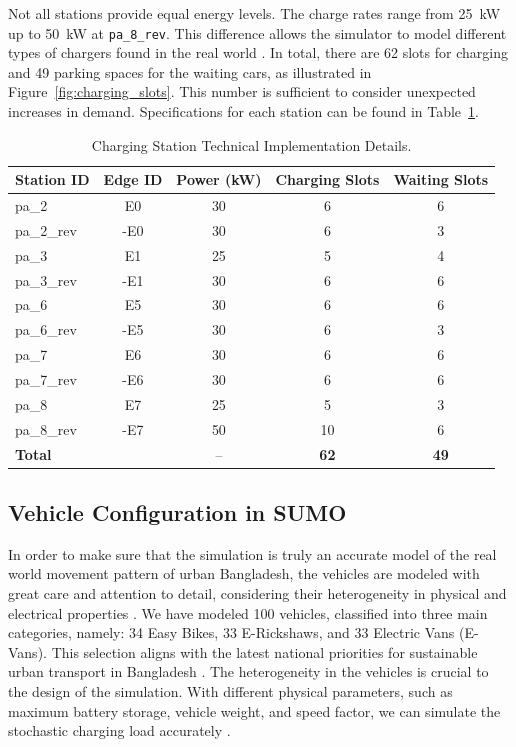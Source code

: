 \documentclass{thesis-library}
\begin{document}
Not all stations provide equal energy levels. The charge rates range from 25~kW up to 50~kW at \texttt{pa\_8\_rev}. This difference allows the simulator to model different types of chargers found in the real world \cite{smart_charging2022}. In total, there are 62 slots for charging and 49 parking spaces for the waiting cars, as illustrated in Figure~\ref{fig:charging_slots}. This number is sufficient to consider unexpected increases in demand. Specifications for each station can be found in Table~\ref{tab:stations}.

\begin{table}[H]
\caption{Charging Station Technical Implementation Details.}
\label{tab:stations}
\begin{center}
\begin{small}
\begin{tabular}{|l|c|c|c|c|}
\hline
\textbf{Station ID} & \textbf{Edge ID} & \textbf{Power (kW)} & \textbf{Charging Slots} & \textbf{Waiting Slots} \\
\hline
pa\_2          & E0    & 30 & 6  & 6 \\
pa\_2\_rev     & -E0   & 30 & 6  & 3 \\
pa\_3          & E1    & 25 & 5  & 4 \\
pa\_3\_rev     & -E1   & 30 & 6  & 6 \\
pa\_6          & E5    & 30 & 6  & 6 \\
pa\_6\_rev     & -E5   & 30 & 6  & 3 \\
pa\_7          & E6    & 30 & 6  & 6 \\
pa\_7\_rev     & -E6   & 30 & 6  & 6 \\
pa\_8          & E7    & 25 & 5  & 3 \\
pa\_8\_rev     & -E7   & 50 & 10 & 6 \\
\hline
\textbf{Total} &       & -- & \textbf{62} & \textbf{49} \\
\hline
\end{tabular}
\end{small}
\end{center}
\end{table}

\subsection{Vehicle Configuration in SUMO}

In order to make sure that the simulation is truly an accurate model of the real world movement pattern of urban Bangladesh, the vehicles are modeled with great care and attention to detail, considering their heterogeneity in physical and electrical properties \cite{sumo_energy2024}. We have modeled 100 vehicles, classified into three main categories, namely: 34 Easy Bikes, 33 E-Rickshaws, and 33 Electric Vans (E-Vans). This selection aligns with the latest national priorities for sustainable urban transport in Bangladesh \cite{bd_ev_industry2024}. The heterogeneity in the vehicles is crucial to the design of the simulation. With different physical parameters, such as maximum battery storage, vehicle weight, and speed factor, we can simulate the stochastic charging load accurately \cite{doley2024sustainability}.
\end{document}
